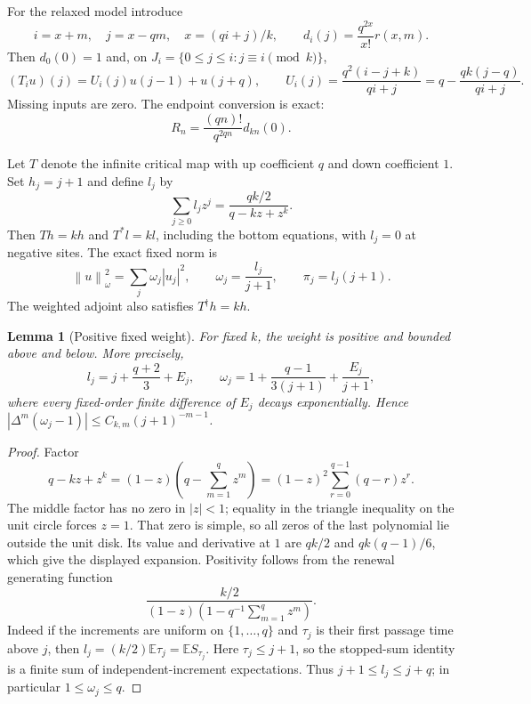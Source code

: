 \documentclass[11pt,letterpaper]{article}
\numberwithin{equation}{section}
\newtheorem{lemma}[theorem]{Lemma}
\theoremstyle{remark}
\newcommand{\norm}[1]{\left\lVert#1\right\rVert}
\begin{document}
For the relaxed model introduce
\[
 i=x+m,\quad j=x-qm,\quad x=(qi+j)/k,
 \qquad d_i(j)=\frac{q^{2x}}{x!}r(x,m).
\]
Then $d_0(0)=1$ and, on $J_i=\{0\le j\le i:j\equiv i\pmod k\}$,
\begin{equation}\label{air:ka:eq:transfer}
 (T_i u)(j)=U_i(j)u(j-1)+u(j+q),\qquad
 U_i(j)=\frac{q^2(i-j+k)}{qi+j}=q-\frac{qk(j-q)}{qi+j}.
\end{equation}
Missing inputs are zero. The endpoint conversion is exact:
\begin{equation}\label{air:ka:eq:conversion}
 R_n=\frac{(qn)!}{q^{2qn}}d_{kn}(0).
\end{equation}

Let $T$ denote the infinite critical map with up coefficient $q$ and down coefficient $1$. Set $h_j=j+1$ and define $l_j$ by
\begin{equation}\label{air:ka:eq:leftgf}
 \sum_{j\ge0}l_jz^j=\frac{qk/2}{q-kz+z^k}.
\end{equation}
Then $Th=kh$ and $T^*l=kl$, including the bottom equations, with $l_j=0$ at negative sites. The exact fixed norm is
\[
 \norm{u}_\omega^2=\sum_j\omega_j|u_j|^2,
 \qquad \omega_j=\frac{l_j}{j+1},\qquad \pi_j=l_j(j+1).
\]
The weighted adjoint also satisfies $T^\dagger h=kh$.

\begin{lemma}[Positive fixed weight]\label{air:ka:lem:weight}
For fixed $k$, the weight is positive and bounded above and below. More precisely,
\[
 l_j=j+\frac{q+2}{3}+E_j,\qquad
 \omega_j=1+\frac{q-1}{3(j+1)}+\frac{E_j}{j+1},
\]
where every fixed-order finite difference of $E_j$ decays exponentially. Hence
$|\Delta^m(\omega_j-1)|\le C_{k,m}(j+1)^{-m-1}$.
\end{lemma}
\begin{proof}
Factor
\[
 q-kz+z^k=(1-z)\left(q-\sum_{m=1}^qz^m\right)
 =(1-z)^2\sum_{r=0}^{q-1}(q-r)z^r.
\]
The middle factor has no zero in $|z|<1$; equality in the triangle inequality on the unit circle forces $z=1$. That zero is simple, so all zeros of the last polynomial lie outside the unit disk. Its value and derivative at $1$ are $qk/2$ and $qk(q-1)/6$, which give the displayed expansion. Positivity follows from the renewal generating function
\[
 \frac{k/2}{(1-z)(1-q^{-1}\sum_{m=1}^qz^m)}.
\]
Indeed if the increments are uniform on $\{1,\ldots,q\}$ and $\tau_j$ is their first passage time above $j$, then $l_j=(k/2)\mathbb E\tau_j=\mathbb E S_{\tau_j}$. Here $\tau_j\le j+1$, so the stopped-sum identity is a finite sum of independent-increment expectations. Thus $j+1\le l_j\le j+q$; in particular $1\le\omega_j\le q$.
\end{proof}
\end{document}
